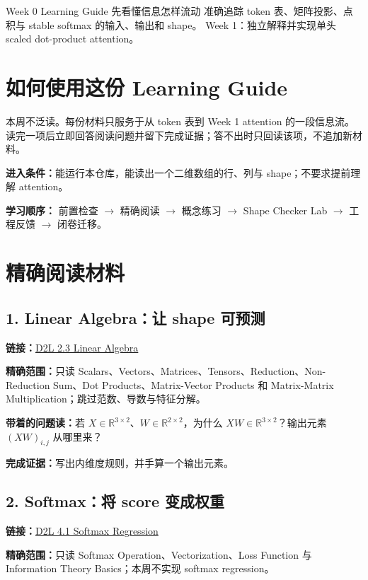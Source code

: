 \documentclass[11pt,a4paper]{article}
\begin{document}
\CourseCover
  {Week 0 Learning Guide}
  {先看懂信息怎样流动}
  {准确追踪 token 表、矩阵投影、点积与 stable softmax 的输入、输出和 shape。}
  {Week 1：独立解释并实现单头 scaled dot-product attention。}

\section{如何使用这份 Learning Guide}

本周不泛读。每份材料只服务于从 token 表到 Week 1 attention 的一段信息流。
读完一项后立即回答阅读问题并留下完成证据；答不出时只回读该项，不追加新材料。

\textbf{进入条件：}能运行本仓库，能读出一个二维数组的行、列与 shape；不要求提前理解 attention。

\textbf{学习顺序：}
前置检查 $\rightarrow$ 精确阅读 $\rightarrow$ 概念练习 $\rightarrow$ Shape Checker Lab
$\rightarrow$ 工程反馈 $\rightarrow$ 闭卷迁移。

\section{精确阅读材料}

\subsection{1. Linear Algebra：让 shape 可预测}
\textbf{链接：}\href{https://d2l.ai/chapter_preliminaries/linear-algebra.html}{D2L 2.3 Linear Algebra}

\textbf{精确范围：}只读 Scalars、Vectors、Matrices、Tensors、Reduction、Non-Reduction Sum、Dot Products、Matrix-Vector Products 和 Matrix-Matrix Multiplication；跳过范数、导数与特征分解。

\textbf{带着的问题读：}若 $X\in\mathbb{R}^{3\times2}$、$W\in\mathbb{R}^{2\times2}$，为什么 $XW\in\mathbb{R}^{3\times2}$？输出元素 $(XW)_{i,j}$ 从哪里来？

\textbf{完成证据：}写出内维度规则，并手算一个输出元素。

\subsection{2. Softmax：将 score 变成权重}
\textbf{链接：}\href{https://d2l.ai/chapter_linear-classification/softmax-regression.html}{D2L 4.1 Softmax Regression}

\textbf{精确范围：}只读 Softmax Operation、Vectorization、Loss Function 与 Information Theory Basics；本周不实现 softmax regression。
\end{document}
